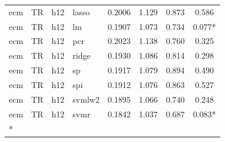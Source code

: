 \begin{ThreePartTable}
\begin{longtable}[t]{llclcccc}
ecm & TR & h12 & lasso & 0.2006 & 1.129 & 0.873 & 0.586\\
ecm & TR & h12 & lm & 0.1907 & 1.073 & 0.734 & 0.077*\\
ecm & TR & h12 & pcr & 0.2023 & 1.138 & 0.760 & 0.325\\
ecm & TR & h12 & ridge & 0.1930 & 1.086 & 0.814 & 0.298\\
ecm & TR & h12 & sp & 0.1917 & 1.079 & 0.894 & 0.490\\
ecm & TR & h12 & spi & 0.1912 & 1.076 & 0.863 & 0.527\\
ecm & TR & h12 & svmlw2 & 0.1895 & 1.066 & 0.740 & 0.248\\
ecm & TR & h12 & svmr & 0.1842 & 1.037 & 0.687 & 0.083*\\*
\end{longtable}
\end{ThreePartTable}
\endgroup{}
